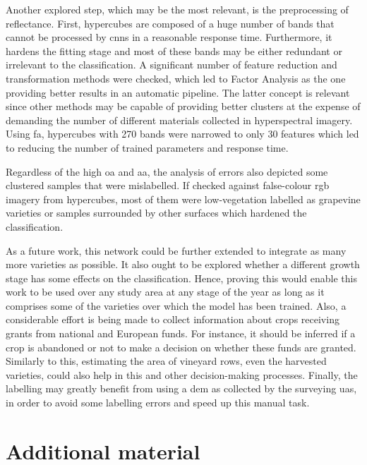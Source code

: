 Another explored step, which may be the most relevant, is the preprocessing of reflectance. First, hypercubes are composed of a huge number of bands that cannot be processed by \acrshort{cnn}s in a reasonable response time. Furthermore, it hardens the fitting stage and most of these bands may be either redundant or irrelevant to the classification. A significant number of feature reduction and transformation methods were checked, which led to Factor Analysis as the one providing better results in an automatic pipeline. The latter concept is relevant since other methods may be capable of providing better clusters at the expense of demanding the number of different materials collected in hyperspectral imagery. Using \acrshort{fa}, hypercubes with 270 bands were narrowed to only 30 features which led to reducing the number of trained parameters and response time. 

Regardless of the high \acrshort{oa} and \acrshort{aa}, the analysis of errors also depicted some clustered samples that were mislabelled. If checked against false-colour \acrshort{rgb} imagery from hypercubes, most of them were low-vegetation labelled as grapevine varieties or samples surrounded by other surfaces which hardened the classification. 

As a future work, this network could be further extended to integrate as many more varieties as possible. It also ought to be explored whether a different growth stage has some effects on the classification. Hence, proving this would enable this work to be used over any study area at any stage of the year as long as it comprises some of the varieties over which the model has been trained. Also, a considerable effort is being made to collect information about crops receiving grants from national and European funds. For instance, it should be inferred if a crop is abandoned or not to make a decision on whether these funds are granted. Similarly to this, estimating the area of vineyard rows, even the harvested varieties, could also help in this and other decision-making processes. Finally, the labelling may greatly benefit from using a \acrshort{dem} as collected by the surveying \acrshort{uas}, in order to avoid some labelling errors and speed up this manual task. 

\section*{Additional material}

